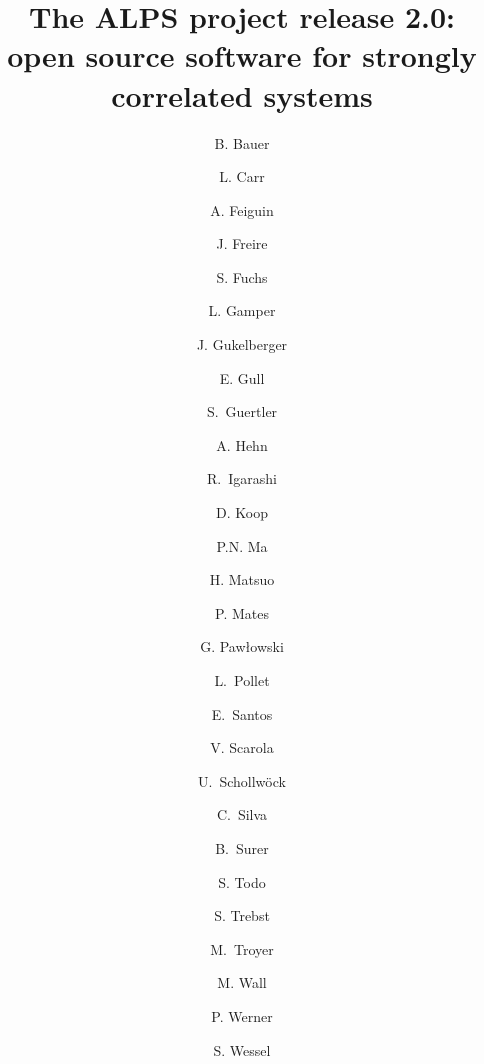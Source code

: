 \documentclass[3p,twocolumn]{elsarticle}
\begin{document}
\begin{frontmatter}

\title{The ALPS project release 2.0: \\ open source software for strongly correlated systems}

\author[eth]{B. Bauer} 
\author[colorado]{L. Carr} 
\author[wyoming]{A. Feiguin} 
\author[utah]{J. Freire} 
\author[goettingen]{S. Fuchs} 
\author[eth]{L. Gamper} 
\author[eth]{J. Gukelberger} 
\author[columbia]{E. Gull} 
\author[bonn]{S.~Guertler} 
\author[eth]{A. Hehn} 
\author[japan]{R.~Igarashi} 
\author[utah]{D. Koop} 
\author[eth]{P.N. Ma} 
\author[tokyo]{H. Matsuo} 
\author[eth,utah]{P. Mates} 
\author[affpol]{G. Paw{\l}owski}
\author[harvard,eth]{L.~Pollet} 
\author[brazil,utah]{E.~Santos} 
\author[virginia]{V. Scarola} 
\author[lmu]{U.~Schollw\"ock} 
\author[utah]{C.~Silva} 
\author[eth]{B.~Surer} 
\author[tokyo]{S. Todo} 
\author[stationq]{S. Trebst} 
\author[eth]{M.~Troyer}
\author[colorado]{M. Wall} 
\author[eth]{P. Werner} 
\author[rwth,stuttgart]{S. Wessel} 

\address[eth]{Theoretische Physik, ETH Zurich, 8093 Zurich, Switzerland}
\address[colorado] {Department of Physics, Colorado School of Mines, Golden, CO 80401, USA}
\address[wyoming]{}
\address[utah]{}
\address[goettingen]{Institut f\"ur Theoretische Physik, Georg-August-Universit\"{a}t G\"{o}ttingen, G\"{o}ttingen, Germany}
\address[columbia]{Columbia University, New York, NY 10027, USA}
\address[bonn]{Bethe Center for Theoretical Phyics, Universit\"{a}t Bonn, Bonn, Germany}
\address[harvard]{} 
\address[affpol]{Institute of Physics, A. Mickiewicz University, ul. Umultowska 85, 61-614 Poznan, Poland}
\address[brazil]{} 
\address[virginia]{}
\address[lmu]{}
\address[tokyo]{Department of Applied Physics, University of Tokyo, 113-8656 Tokyo, Japan}
\address[stationq]{Microsoft Research, Station Q, University of California, Santa Barbara, CA 93106, USA}
\address[rwth]{}
\address[stuttgart]{Institut f\"ur Theoretische Physik III, Universit\"at Stuttgart, Pfaffenwaldring 57, D-70550 Stuttgart, Germany}


\end{frontmatter}
\end{document}
